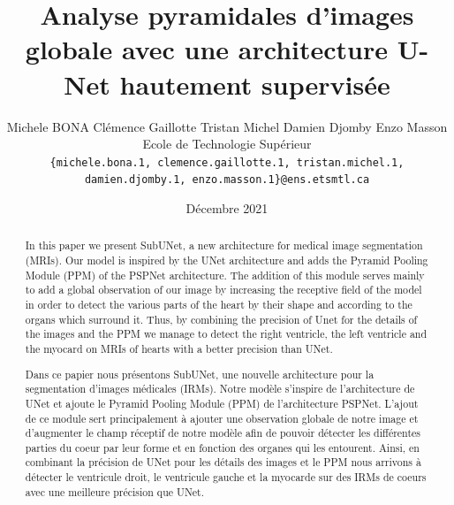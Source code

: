 \documentclass[french, english]{article}
\begin{document}

\title{Analyse pyramidales d'images globale avec une architecture U-Net hautement supervisée}


\author{
Michele BONA \quad Clémence Gaillotte \quad Tristan Michel \quad Damien Djomby \quad Enzo Masson\\
Ecole de Technologie Supérieur\\
{\tt\small \{michele.bona.1, clemence.gaillotte.1, tristan.michel.1, damien.djomby.1, enzo.masson.1\}@ens.etsmtl.ca}}
\date{Décembre 2021}

\maketitle
\normalsize

\begin{abstract}
In this paper we present SubUNet, a new architecture for medical image segmentation (MRIs). Our model is inspired by the UNet architecture and adds the Pyramid Pooling Module (PPM) of the PSPNet architecture. The addition of this module serves mainly to add a global observation of our image by increasing the receptive field of the model in order to detect the various parts of the heart by their shape and according to the organs which surround it. Thus, by combining the precision of Unet for the details of the images and the PPM we manage to detect the right ventricle, the left ventricle and the myocard on MRIs of hearts with a better precision than UNet.
\end{abstract}

\begin{abstract}
Dans ce papier nous présentons SubUNet, une nouvelle architecture pour la segmentation d'images médicales (IRMs). Notre modèle s'inspire de l'architecture de UNet et ajoute le Pyramid Pooling Module (PPM) de l'architecture PSPNet. L'ajout de ce module sert principalement à ajouter une observation globale de notre image et d'augmenter le champ réceptif de notre modèle afin de pouvoir détecter les différentes parties du coeur par leur forme et en fonction des organes qui les entourent. Ainsi, en combinant la précision de UNet pour les détails des images et le PPM nous arrivons à détecter le ventricule droit, le ventricule gauche et la myocarde sur des IRMs de coeurs avec une meilleure précision que UNet.
\end{abstract}
\end{document}

